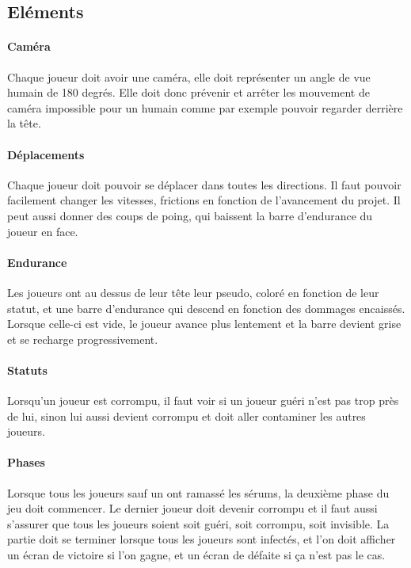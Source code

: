 \documentclass{article}
\begin{document}
\subsection{Eléments}
\paragraph{Caméra}
Chaque joueur doit avoir une caméra, elle doit représenter un angle de vue humain de 180 degrés. Elle doit donc prévenir et arrêter les mouvement de caméra impossible pour un humain comme par exemple pouvoir regarder derrière la tête.

\paragraph{Déplacements}
Chaque joueur doit pouvoir se déplacer dans toutes les directions. Il faut pouvoir facilement changer les vitesses, frictions en fonction de l'avancement du projet. Il peut aussi donner des coups de poing, qui baissent la barre d'endurance du joueur en face.

\paragraph{Endurance}
Les joueurs ont au dessus de leur tête leur pseudo, coloré en fonction de leur statut, et une barre d'endurance qui descend en fonction des dommages encaissés. Lorsque celle-ci est vide, le joueur avance plus lentement et la barre devient grise et se recharge progressivement. 

\paragraph{Statuts}
Lorsqu'un joueur est corrompu, il faut voir si un joueur guéri n'est pas trop près de lui, sinon lui aussi devient corrompu et doit aller contaminer les autres joueurs.

\paragraph{Phases}
Lorsque tous les joueurs sauf un ont ramassé les sérums, la deuxième phase du jeu doit commencer. Le dernier joueur doit devenir corrompu et il faut aussi s'assurer que tous les joueurs soient soit guéri, soit corrompu, soit invisible. La partie doit se terminer lorsque tous les joueurs sont infectés, et l'on doit afficher un écran de victoire si l'on gagne, et un écran de défaite si ça n'est pas le cas.
\end{document}
